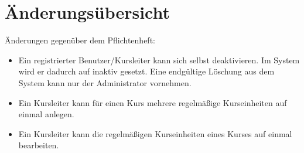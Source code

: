 \chapter*{Änderungsübersicht}
Änderungen gegenüber dem Pflichtenheft:
\begin{itemize}
	\item Ein registrierter Benutzer/Kursleiter kann sich selbst deaktivieren. Im System wird er dadurch auf inaktiv gesetzt. Eine endgültige Löschung aus dem System kann nur der Administrator vornehmen.
	\item Ein Kursleiter kann für einen Kurs mehrere regelmäßige Kurseinheiten auf einmal anlegen.
	\item Ein Kursleiter kann die regelmäßigen Kurseinheiten eines Kurses auf einmal bearbeiten.
\end{itemize} 
